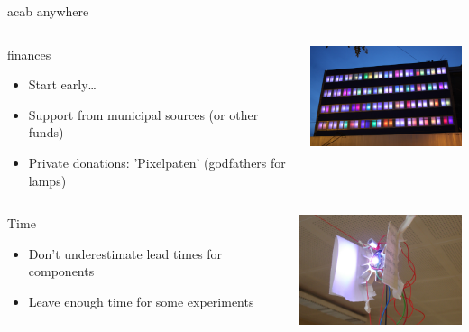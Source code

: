 \documentclass{beamer}
\begin{document}
\begin{frame}{acab anywhere}
  \begin{columns}
    \begin{column}{5cm}
      \begin{block}{finances}
        \begin{itemize}
        \item Start early\ldots
        \item Support from municipal sources (or other funds)
        \item Private donations: 'Pixelpaten' (godfathers for lamps)
        \end{itemize}
      \end{block}
    \end{column}
    \begin{column}{5cm}
      \includegraphics[width=5cm]{bilder/pixelpaten.JPG}
    \end{column}
  \end{columns}
  \begin{columns}
    \begin{column}{5cm}
      \begin{block}{Time}
        \begin{itemize}
        \item Don't underestimate lead times for components 
        \item Leave enough time for some experiments
        \end{itemize}
      \end{block}
    \end{column}
    \begin{column}{5cm}
      \includegraphics[width=5cm]{bilder/rumprobieren.JPG}
    \end{column}
  \end{columns}
\end{frame}
\end{document}
